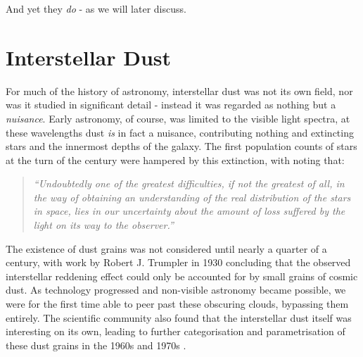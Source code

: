 And yet they \emph{do} - as we will later discuss.

\section{Interstellar Dust}
\label{sec:dust}

For much of the history of astronomy, interstellar dust was not its own field, nor was it studied in significant detail - instead it was regarded as nothing but a \emph{nuisance}.
Early astronomy, of course, was limited to the visible light spectra, at these wavelengths dust \emph{is} in fact a nuisance, contributing nothing and extincting stars and the innermost depths of the galaxy.
The first population counts of stars at the turn of the  century were hampered by this extinction, with \textcite{kapteynAbsorptionLightSpace1909} noting that:

\begin{quote}
  \textit{
    ``Undoubtedly one of the greatest difficulties, if not the greatest of all, in the way of obtaining an understanding of the real distribution of the stars in space, lies in our uncertainty about the amount of loss suffered by the light on its way to the observer.''
  }
\end{quote}

\noindent
The existence of dust grains was not considered until nearly a quarter of a century, with work by Robert J. Trumpler in 1930 concluding that the observed interstellar reddening effect could only be accounted for by small grains of cosmic dust.
As technology progressed and non-visible astronomy became possible, we were for the first time able to peer past these obscuring clouds, bypassing them entirely.
The scientific community also found that the interstellar dust itself was interesting on its own, leading to further categorisation and parametrisation of these dust grains in the 1960s and 1970s
\parencite[4-13]{whittetDustGalacticEnvironment2002}.

